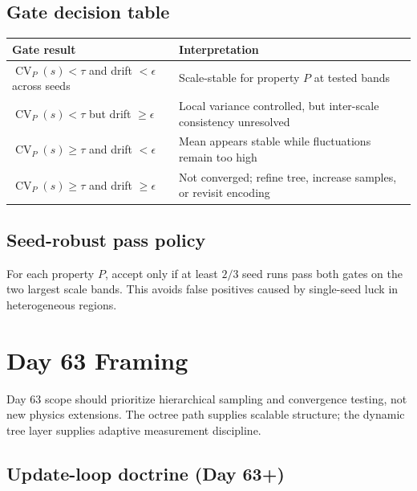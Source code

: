 \documentclass[11pt, a4paper, oneside]{article}
\DeclareMathOperator{\CV}{CV}
\begin{document}
\subsection{Gate decision table}

\begin{center}
\begin{tabularx}{\linewidth}{lX}
\toprule
Gate result & Interpretation \\
\midrule
$\CV_P(s) < \tau$ and drift $<\epsilon$ across seeds & Scale-stable for property $P$ at tested bands \\
$\CV_P(s) < \tau$ but drift $\ge \epsilon$ & Local variance controlled, but inter-scale consistency unresolved \\
$\CV_P(s) \ge \tau$ and drift $<\epsilon$ & Mean appears stable while fluctuations remain too high \\
$\CV_P(s) \ge \tau$ and drift $\ge \epsilon$ & Not converged; refine tree, increase samples, or revisit encoding \\
\bottomrule
\end{tabularx}
\end{center}

\subsection{Seed-robust pass policy}

For each property $P$, accept only if at least $2/3$ seed runs pass both gates
on the two largest scale bands. This avoids false positives caused by
single-seed luck in heterogeneous regions.

\section{Day 63 Framing}

Day 63 scope should prioritize hierarchical sampling and convergence testing, not new physics extensions.
The octree path supplies scalable structure; the dynamic tree layer supplies adaptive measurement discipline.

\subsection{Update-loop doctrine (Day 63+)}
\end{document}
